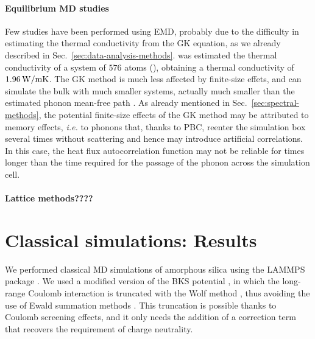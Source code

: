 \paragraph{Equilibrium MD studies}
Few studies have been performed using EMD, probably due to the difficulty in estimating the thermal conductivity from the GK equation, as we already described in Sec.~\ref{sec:data-analysis-methods}.
\citet{McGaughey2004b} was estimated the thermal conductivity of a system of $576$ atoms (), obtaining a thermal conductivity of $1.96\,\mathrm{W/mK}$. 
The GK method is much less affected by finite-size effets, and can simulate the bulk with much smaller systems, actually much smaller than the estimated phonon mean-free path \cite{Schelling2002}. As already mentioned in Sec.~\ref{sec:spectral-methods}, the potential finite-size effects of the GK method may be attributed to memory effects, \emph{i.e.} to phonons that, thanks to PBC, reenter the simulation box several times without scattering and hence may introduce artificial correlations. In this case, the heat flux autocorrelation function may not be reliable for times longer than the time required for the passage of the phonon across the simulation cell. 

\paragraph{Lattice methods????}


\section{Classical simulations: Results}
We performed classical MD simulations of amorphous silica using the \textsc{LAMMPS} package \cite{LAMMPS1995}. 
We used a modified version of the BKS potential \cite{Carre2008}, in which the long-range Coulomb interaction is truncated with the Wolf method \cite{Wolf1992,Wolf1999,Fennel2006}, thus avoiding the use of Ewald summation methods \cite{Allen1989,Frenkel2001}. This truncation is possible thanks to Coulomb screening effects, and it only needs the addition of a correction term that recovers the requirement of charge neutrality. 

